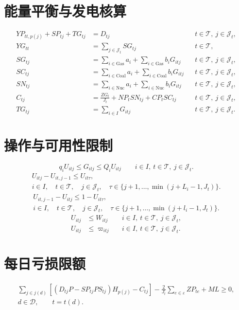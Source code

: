 \documentclass[11pt,a4paper]{article}
\begin{document}
\section*{能量平衡与发电核算}
\begin{align}
YP_{tt,p(j)}+SP_{tj}+TG_{tj}&=D_{tj}
&&t\in\mathcal T,\ j\in\mathcal J_t,\tag{11}\\
YG_{tt}&=\sum_{j\in\mathcal J_t}SG_{tj}
&&t\in\mathcal T,\tag{12}\\
SG_{tj}&=\sum_{i\in\mathrm{Gas}}a_i
       +\sum_{i\in\mathrm{Gas}}b_iG_{itj}
&&t\in\mathcal T,\ j\in\mathcal J_t,\tag{13}\\
SC_{tj}&=\sum_{i\in\mathrm{Coal}}a_i
       +\sum_{i\in\mathrm{Coal}}b_iG_{itj}
&&t\in\mathcal T,\ j\in\mathcal J_t,\tag{14}\\
SN_{tj}&=\sum_{i\in\mathrm{Nuc}}a_i
       +\sum_{i\in\mathrm{Nuc}}b_iG_{itj}
&&t\in\mathcal T,\ j\in\mathcal J_t,\tag{15}\\
C_{tj}&=\frac{ZG_t}{J_t}+NP_tSN_{tj}+CP_tSC_{tj}
&&t\in\mathcal T,\ j\in\mathcal J_t,\tag{16}\\
TG_{tj}&=\sum_{i\in I}G_{itj}
&&t\in\mathcal T,\ j\in\mathcal J_t.\tag{17}
\end{align}

\section*{操作与可用性限制}
\begin{equation}
q_iU_{itj}\le G_{itj}\le Q_iU_{itj}
\qquad i\in I,\ t\in\mathcal T,\ j\in\mathcal J_t.
\tag{18}
\end{equation}
\begin{equation}
\begin{gathered}
U_{itj}-U_{it,j-1}\le U_{it\tau},\\
i\in I,\quad t\in\mathcal T,\quad j\in\mathcal J_t,\quad
\tau\in\{j+1,\ldots,\min(j+L_i-1,J_t)\}.
\end{gathered}
\tag{19}
\end{equation}
\begin{equation}
\begin{gathered}
U_{it,j-1}-U_{itj}\le 1-U_{it\tau},\\
i\in I,\quad t\in\mathcal T,\quad j\in\mathcal J_t,\quad
\tau\in\{j+1,\ldots,\min(j+l_i-1,J_t)\}.
\end{gathered}
\tag{20}
\end{equation}
\begin{align}
U_{itj}&\le W_{itj}
&&i\in I,\ t\in\mathcal T,\ j\in\mathcal J_t,\tag{21}\\
U_{itj}&\le\varpi_{itj}
&&i\in I,\ t\in\mathcal T,\ j\in\mathcal J_t.\tag{22}
\end{align}

\section*{每日亏损限额}
\begin{equation}
\begin{gathered}
\sum_{j\in j(d)}
\left[(D_{tj}P-SP_{tj}PS_{tj})H_{p(j)}-C_{tj}\right]
-\frac{2}{J_t}\sum_{e\in\varepsilon}ZP_{te}+ML\ge0,\\
d\in\mathcal D,\qquad t=t(d).
\end{gathered}
\tag{23}
\end{equation}
\end{document}
